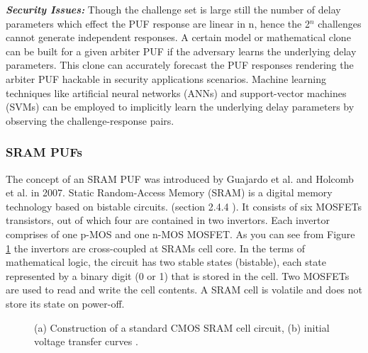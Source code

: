\textbf{\emph{Security Issues:}}
Though the challenge set is large still the number of delay parameters which effect the PUF response are linear in n, hence the 2$^n$ challenges cannot generate independent responses. A certain model or mathematical clone can be built for a given arbiter PUF if the adversary learns the underlying delay parameters. This clone can accurately forecast the PUF responses rendering the arbiter PUF hackable in security applications scenarios. Machine learning techniques like artificial neural
networks (ANNs) and support-vector machines (SVMs) can be employed to implicitly learn the underlying delay parameters by observing the challenge-response pairs.

\subsubsection{SRAM PUFs}
\label{srampufs}
The concept of an SRAM PUF was introduced by Guajardo et al. \cite{11} and Holcomb et al. \cite{50} in 2007. Static Random-Access Memory (SRAM) is a digital memory technology based on bistable circuits. (section 2.4.4 \cite{17}). It consists of six MOSFETs transistors, out of which four are contained in two invertors. Each invertor comprises of one p-MOS and one n-MOS MOSFET. As you can see from Figure \ref{img:sram} the invertors are cross-coupled at SRAMs cell core. In the terms of mathematical logic, the circuit has two stable states (bistable), each state represented by a binary
digit (0 or 1) that is stored in the cell. Two MOSFETs are used to read and write the cell contents. A SRAM cell is volatile and does not store its state on power-off.\\

\begin{figure}
\centering
{}
\caption{(a) Construction of a standard CMOS SRAM cell circuit, (b) initial voltage transfer curves  \cite{17}.}
\label{img:sram}
\end{figure}


